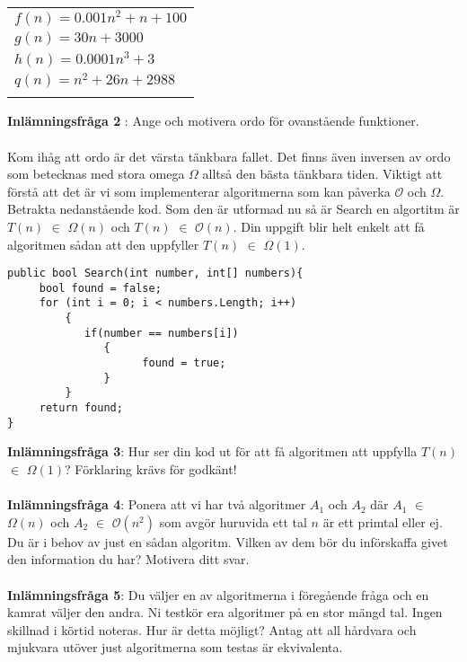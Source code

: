 \documentclass{article}
\begin{document}
 \begin{center}
 \begin{tabular}{ l }
	$f(n) = 0.001n^2 + n + 100$ \\
	$g(n) = 30n + 3000$\\
	$h(n) = 0.0001n^3 + 3$\\
	$q(n) = n^2 + 26n + 2988$\\\\
	\end{tabular}
 \end{center} 
 \textbf{Inlämningsfråga 2} : Ange och motivera ordo för ovanstående funktioner. \\\\
  Kom ihåg att ordo är det värsta tänkbara fallet. Det finns även inversen av ordo som betecknas med stora omega $\Omega$ alltså den bästa tänkbara tiden. Viktigt att förstå att det är vi som implementerar algoritmerna som kan påverka $\mathcal{O}$ och $\Omega$. Betrakta nedanstående kod. Som den är utformad nu så är Search en algortitm är  $T(n)$ $\in$ $\Omega  (n)$ och $T(n)$ $\in$ $\mathcal{O}(n)$. Din uppgift blir helt enkelt att få algoritmen sådan att den uppfyller  $T(n)$ $\in$ $\Omega(1)$.
  \begin{lstlisting}
public bool Search(int number, int[] numbers){
     bool found = false;
     for (int i = 0; i < numbers.Length; i++)
         { 
            if(number == numbers[i])
               {
                     found = true;
               }
         }
     return found; 
}
   \end{lstlisting}
  
  \textbf{Inlämningsfråga 3}: Hur ser din kod ut för att få algoritmen att uppfylla $T(n)$ $\in$ $\Omega(1)$? Förklaring krävs för godkänt! \\\\

      \textbf{Inlämningsfråga 4}: Ponera att vi har två algoritmer $A_1$ och $A_2$ där  $A_1$ $\in$ $\Omega (n)$ och  $A_2$ $\in$ $\mathcal{O}(n^2)$ som avgör huruvida ett tal $n$ är ett primtal eller ej. Du är i behov av just en sådan algoritm. Vilken av dem bör du införskaffa givet den information du har? Motivera ditt svar.\\\\
	      
      \textbf{Inlämningsfråga 5}: Du väljer en av algoritmerna i föregående fråga och en kamrat väljer den andra. Ni
      testkör era algoritmer på en stor mängd tal. Ingen skillnad i körtid noteras. Hur är
      detta möjligt? Antag att all hårdvara och mjukvara utöver just algoritmerna som testas
      är ekvivalenta.
      
\end{document}
